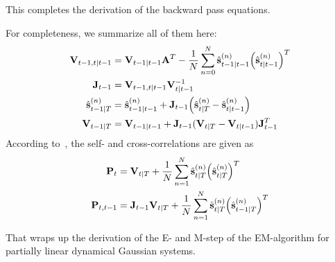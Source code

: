 		This completes the derivation of the backward pass equations.
		
		For completeness, we summarize all of them here:
		\begin{align}
			\boldsymbol{\mathrm{V}}_{t - 1, t \vert t - 1} &= \boldsymbol{\mathrm{V}}_{t - 1 \vert t - 1} \boldsymbol{\mathrm{A}}^T - \frac{1}{N} \sum_{n = 0}^{N} \hat{\boldsymbol{\mathrm{s}}}_{t - 1 \vert t - 1}^{(n)} \Big(\hat{\boldsymbol{\mathrm{s}}}_{t \vert t - 1}^{(n)}\Big)^T  \nonumber \\
			\boldsymbol{\mathrm{J}}_{t - 1} &= \boldsymbol{\mathrm{V}}_{t - 1, t \vert t - 1} \boldsymbol{\mathrm{V}}_{t \vert t - 1}^{-1}  \nonumber \\
			\hat{\boldsymbol{\mathrm{s}}}_{t - 1 \vert T}^{(n)} &= \hat{\boldsymbol{\mathrm{s}}}_{t - 1 \vert t - 1}^{(n)} + \boldsymbol{\mathrm{J}}_{t - 1} \Big(\hat{\boldsymbol{\mathrm{s}}}_{t \vert T}^{(n)} - \hat{\boldsymbol{\mathrm{s}}}_{t \vert t - 1}^{(n)}\Big)  \label{eq:posteriorMean} \\
			\boldsymbol{\mathrm{V}}_{t - 1 \vert T} &= \boldsymbol{\mathrm{V}}_{t - 1 \vert t - 1} + \boldsymbol{\mathrm{J}}_{t - 1} (\boldsymbol{\mathrm{V}}_{t \vert T} - \boldsymbol{\mathrm{V}}_{t \vert t - 1}) \boldsymbol{\mathrm{J}}_{t - 1}^T  \label{eq:posteriorCov}
		\end{align}
		According to~\cite{minkaBayesianLinearRegression1999}, the self- and cross-correlations are given as
		\begin{align*}
			\boldsymbol{\mathrm{P}}_t &= \boldsymbol{\mathrm{V}}_{t \vert T} + \frac{1}{N} \sum_{n = 1}^{N} \hat{\boldsymbol{\mathrm{s}}}_{t \vert T}^{(n)} \Big(\hat{\boldsymbol{\mathrm{s}}}_{t \vert T}^{(n)}\Big)^T \\
			\boldsymbol{\mathrm{P}}_{t, t - 1} &= \boldsymbol{\mathrm{J}}_{t - 1} \boldsymbol{\mathrm{V}}_{t \vert T} + \frac{1}{N} \sum_{n = 1}^{N} \hat{\boldsymbol{\mathrm{s}}}_{t \vert T}^{(n)} \Big(\hat{\boldsymbol{\mathrm{s}}}_{t - 1 \vert T}^{(n)}\Big)^T
		\end{align*}
		
		That wraps up the derivation of the E- and M-step of the EM-algorithm for partially linear dynamical Gaussian systems.
	
